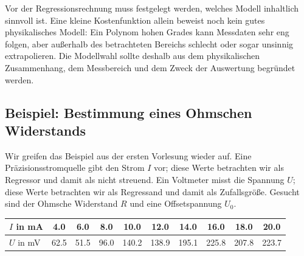 Vor der Regressionsrechnung muss festgelegt werden, welches Modell inhaltlich sinnvoll ist. Eine kleine Kostenfunktion allein beweist noch kein gutes physikalisches Modell: Ein Polynom hohen Grades kann Messdaten sehr eng folgen, aber außerhalb des betrachteten Bereichs schlecht oder sogar unsinnig extrapolieren. Die Modellwahl sollte deshalb aus dem physikalischen Zusammenhang, dem Messbereich und dem Zweck der Auswertung begründet werden.

\subsection{Beispiel: Bestimmung eines Ohmschen Widerstands}
Wir greifen das Beispiel aus der ersten Vorlesung wieder auf. Eine Präzisionsstromquelle gibt den Strom $I$ vor; diese Werte betrachten wir als Regressor und damit als nicht streuend. Ein Voltmeter misst die Spannung $U$; diese Werte betrachten wir als Regressand und damit als Zufallsgröße. Gesucht sind der Ohmsche Widerstand $R$ und eine Offsetspannung $U_0$.

\begin{center}
\begin{tabular}{l||c|c|c|c|c|c|c|c|c}
\hline\hline
$I$ in mA &    4.0 &     6.0 &     8.0 &    10.0 &    12.0 &    14.0 &    16.0 &    18.0 &    20.0\\
\hline
$U$ in mV &    62.5 &    51.5 &    96.0 &   140.2 &   138.9 &   195.1 &   225.8 &   207.8 &   223.7 \\
\hline\hline
\end{tabular}
\end{center}

